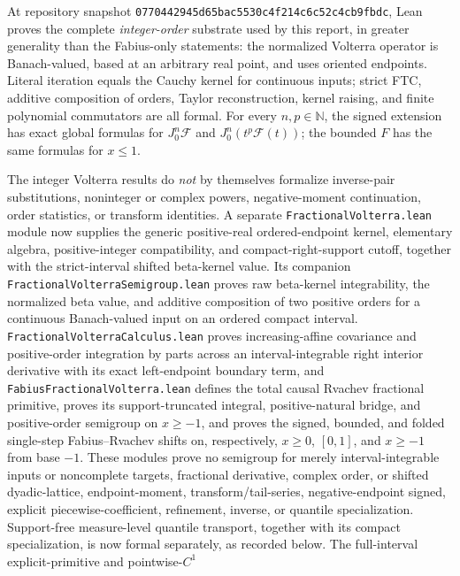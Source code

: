\documentclass[11pt,oneside]{article}
\theoremstyle{definition}
\theoremstyle{remark}
\newcommand{\F}{F}
\newcommand{\N}{\mathbb N}
\newcommand{\1}{\mathbf 1}
\begin{document}
\begin{statusbox}
At repository snapshot
\texttt{0770442945d65bac5530c4f214c6c52c4cb9fbdc}, Lean proves the complete
\emph{integer-order} substrate used by this report, in greater generality than the
Fabius-only statements: the normalized Volterra operator is Banach-valued, based at an
arbitrary real point, and uses oriented endpoints.  Literal iteration equals the Cauchy
kernel for continuous inputs; strict FTC, additive composition of orders, Taylor
reconstruction, kernel raising, and finite polynomial commutators are all formal.
For every \(n,p\in\N\), the signed extension has exact global formulas for
\(J_0^n\mathcal F\) and \(J_0^n(t^p\mathcal F(t))\); the bounded \(\F\) has the same
formulas for \(x\le1\).

The integer Volterra results do \emph{not} by themselves formalize inverse-pair
substitutions, noninteger or complex powers, negative-moment continuation, order statistics,
or transform identities.  A separate \texttt{FractionalVolterra.lean} module now supplies
the generic positive-real ordered-endpoint kernel, elementary algebra, positive-integer
compatibility, and compact-right-support cutoff, together with the strict-interval shifted
beta-kernel value.  Its companion
\texttt{FractionalVolterraSemigroup.lean} proves raw beta-kernel integrability, the
normalized beta value, and additive composition of two positive orders for a continuous
Banach-valued input on an ordered compact interval.
\texttt{FractionalVolterraCalculus.lean} proves increasing-affine covariance and
positive-order integration by parts across an interval-integrable right interior derivative
with its exact left-endpoint boundary term, and
\texttt{FabiusFractionalVolterra.lean} defines the total causal Rvachev fractional
primitive, proves its support-truncated integral, positive-natural bridge, and positive-order
semigroup on \(x\ge-1\), and proves the signed, bounded, and folded single-step
Fabius--Rvachev shifts on, respectively, \(x\ge0\), \([0,1]\), and \(x\ge-1\) from base
\(-1\).  These modules prove no semigroup for merely
interval-integrable inputs or noncomplete targets, fractional derivative, complex order, or
shifted dyadic-lattice, endpoint-moment, transform/tail-series, negative-endpoint signed,
explicit piecewise-coefficient, refinement, inverse, or quantile specialization.
Support-free
measure-level quantile transport, together with its compact specialization, is now formal
separately, as recorded below.  The full-interval explicit-primitive and pointwise-\(C^1\)

\end{statusbox}
\end{document}
